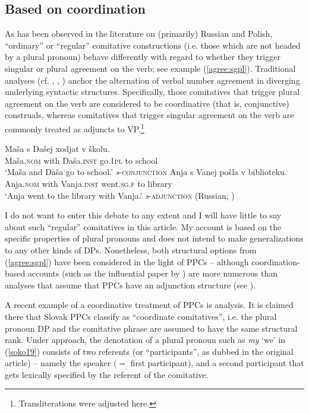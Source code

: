 \documentclass[output=paper,colorlinks,citecolor=brown]{langscibook}
\begin{document}
\subsection{Based on coordination}\label{sec:coord}
As has been observed in the literature on (primarily) Russian and Polish, ``ordinary'' or ``regular'' comitative constructions (i.e. those which are not headed by a plural pronoun) behave differently with regard to whether they trigger singular or plural agreement on the verb; see example (\ref{agree:sgpl}). Traditional analyses (cf. \cite{Dyla1988}, \cite{McNally1993}, \cite{FeldmanDyla2008}) anchor the alternation of verbal number agreement in diverging underlying syntactic structures. Specifically, those comitatives that trigger plural agreement on the verb are considered to be coordinative (that is, conjunctive) construals, whereas comitatives that trigger singular agreement on the verb are commonly treated as adjuncts to VP.\footnote{Transliterations were adjusted here.} 

\ea \label{agree:sgpl} \ea
\gll Maša s Dašej xodjat v školu. \\
Maša.\textsc{nom} with Daša.\textsc{inst} go.\textsc{1pl} to school \\
 \glt `Maša and Daša go to school.' \hfill \textit{s}-\textsc{conjunction}
\ex
\gll Anja s Vanej pošla v biblioteku. \\
Anja.\textsc{nom} with Vanja.\textsc{inst} went.\textsc{sg.f} to library \\
 \glt `Anja went to the library with Vanja.' \hfill \textit{s}-\textsc{adjunction}
\z
\hfill (Russian; \cite{Feldman2003})
\z

\noindent I do not want to enter this debate to any extent and I will have little to say about such ``regular'' comitatives in this article. My account is based on the specific properties of plural pronouns and does not intend to make generalizations to any other kinds of DPs. Nonetheless, both structural options from (\ref{agree:sgpl}) have been considered in the light of PPCs -- although coordination-based accounts (such as the influential paper by \cite{McNally1993}) are more numerous than analyses that assume that PPCs have an adjunction structure (see \cite{Ladusaw1989}). 


A recent example of a coordinative treatment of PPCs is  analysis. It is claimed there that Slovak PPCs classify as ``coordinate comitatives'', i.e. the plural pronoun DP and the comitative phrase are assumed to have the same structural rank. Under  approach, the denotation of a plural pronoun such as \textit{my} `we' in (\ref{soko19}) consists of two referents (or ``participants'', as dubbed in the original article) -- namely the speaker ($=$ first participant), and a second participant that gets lexically specified by the referent of the comitative.
\end{document}
